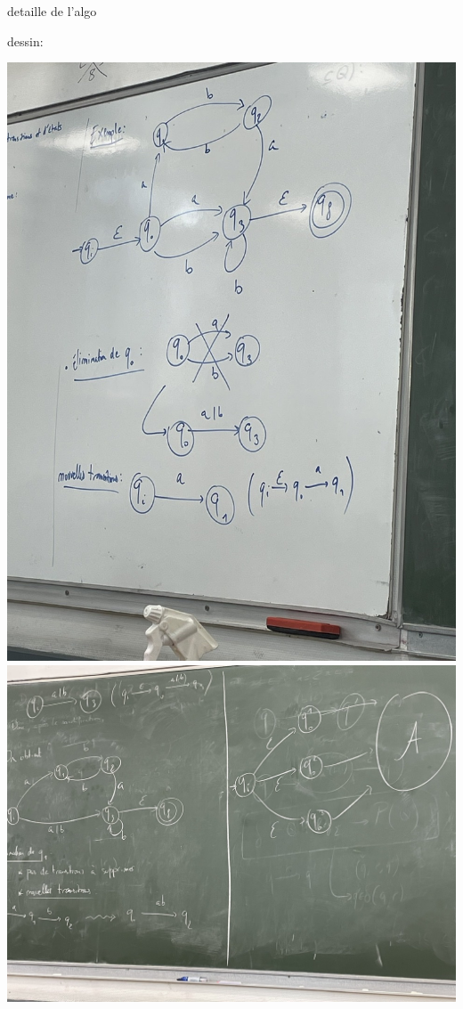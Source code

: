 \documentclass[a4paper,french,bookmarks]{book}
\begin{document}
    \begin{example}{detaille de l'algo }{}
        
        dessin:
        
        \includegraphics[scale=0.2]{Dessin/Tableau1.jpeg}%
        \vspace{2cm}
        \includegraphics[scale=0.2]{Dessin/Tableau2.jpeg}

\end{example}
\end{document}
